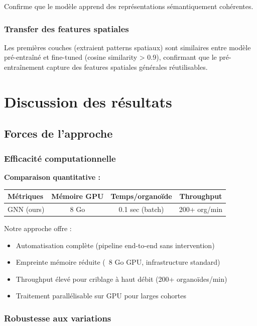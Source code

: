 Confirme que le modèle apprend des représentations sémantiquement cohérentes.

\subsubsection{Transfer des features spatiales}

Les premières couches (extraient patterns spatiaux) sont similaires entre modèle pré-entraîné et fine-tuned (cosine similarity > 0.9), confirmant que le pré-entraînement capture des features spatiales générales réutilisables.


\section{Discussion des résultats}

\subsection{Forces de l'approche}

\subsubsection{Efficacité computationnelle}

\textbf{Comparaison quantitative :}

\begin{center}
\begin{tabular}{|l|c|c|c|}
\hline
\textbf{Métriques} & \textbf{Mémoire GPU} & \textbf{Temps/organoïde} & \textbf{Throughput} \\
\hline
GNN (ours) & 8 Go & 0.1 sec (batch) & 200+ org/min \\
\hline
\end{tabular}
\end{center}

Notre approche offre :
\begin{itemize}
    \item Automatisation complète (pipeline end-to-end sans intervention)
    \item Empreinte mémoire réduite (~8 Go GPU, infrastructure standard)
    \item Throughput élevé pour criblage à haut débit (200+ organoïdes/min)
    \item Traitement parallélisable sur GPU pour larges cohortes
\end{itemize}

\subsubsection{Robustesse aux variations}


